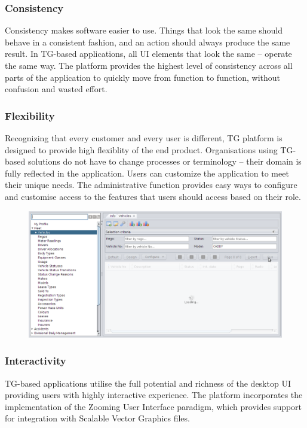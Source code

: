 \documentclass[a4paper,10pt,twocolumn]{article}
\begin{document}
\subsubsection*{Consistency}

  Consistency makes software easier to use. 
  Things that look the same should behave in a consistent fashion, and an action should always produce the same result. 
  In TG-based applications, all UI elements that look the same -- operate the same way. 
  The platform provides the highest level of consistency across all parts of the application to quickly move from function to function, without confusion and wasted effort.
 
\subsubsection*{Flexibility}
  Recognizing that every customer and every user is different, TG platform is designed to provide high flexiblity of the end product. 
  Organisations using TG-based solutions do not have to change processes or terminology -- their domain is fully reflected in the application. 
  Users can customize the application to meet their unique needs.
  The administrative function provides easy ways to configure and customise access to the features that users should access based on their role.

  \begin{figure}[!h]
  \centering
  \includegraphics[scale=0.2]{images/03-running.png}
  \end{figure}

\subsubsection*{Interactivity}
  TG-based applications utilise the full potential and richness of the desktop UI providing users with highly interactive experience.
  The platform incorporates the implementation of the Zooming User Interface paradigm, which provides support for integration with Scalable Vector Graphics files.
\end{document}
